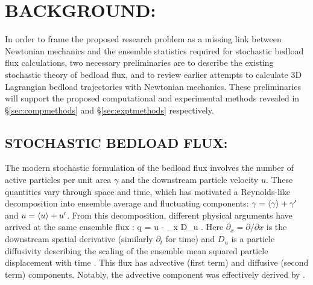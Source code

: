 \section{BACKGROUND:} \label{sec:background}

In order to frame the proposed research problem as a missing link between Newtonian mechanics and the ensemble statistics required for stochastic bedload flux calculations, two necessary preliminaries are to describe the existing stochastic theory of bedload flux, and to review earlier attempts to calculate 3D Lagrangian bedload trajectories with Newtonian mechanics. These preliminaries will support the proposed computational and experimental methods revealed in \S \ref{sec:compmethods} and \S \ref{sec:exptmethods} respectively.


\subsection{STOCHASTIC BEDLOAD FLUX:} \label{sec:stochasticbackground}


The modern stochastic formulation of the bedload flux involves the number of active particles per unit area $\gamma$ and the downstream particle velocity $u$. These quantities vary through space and time, which has motivated a Reynolds-like decomposition into ensemble average and fluctuating components:  $\gamma = \langle \gamma \rangle + \gamma'$ and $u = \langle u \rangle + u'$. From this decomposition, different physical arguments have arrived at the same ensemble flux \citep{Furbish2012b, Ancey2014, Ballio2014}: 
\be \bra q \ket  = \bra u \ket \bra \gamma \ket - \partial_x D_u \bra \gamma \ket . \label{eq:flux}\ee Here $\partial_x = \partial / \partial x$ is the downstream spatial derivative (similarly $\partial_t$ for time) and $D_u$ is a particle diffusivity describing the scaling of the ensemble mean squared particle displacement with time \citep{Furbish2012b}. This flux has advective (first term) and diffusive (second term) components. Notably, the advective component was effectively derived by \cite{Einstein1950}. 
\bigskip 

